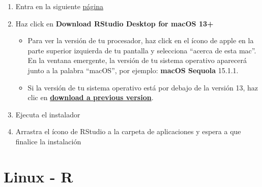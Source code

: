 \documentclass[
  spanish,
  12pt,
  letterpaper,
  DIV=11,
  numbers=noendperiod]{scrreprt}
\providecommand{\tightlist}{%
  \setlength{\itemsep}{0pt}\setlength{\parskip}{0pt}}
\begin{document}
\begin{enumerate}
\def\labelenumi{\arabic{enumi}.}
\tightlist
\item
  Entra en la siguiente
  \href{https://posit.co/download/rstudio-desktop/\#download}{página}
\item
  Haz click en \textbf{Download RStudio Desktop for macOS 13+}

  \begin{itemize}
  \tightlist
  \item
    Para ver la versión de tu procesador, haz click en el ícono de apple
    en la parte superior izquierda de tu pantalla y selecciona ``acerca
    de esta mac''. En la ventana emergente, la versión de tu sistema
    operativo aparecerá junto a la palabra ``macOS'', por ejemplo:
    \textbf{macOS Sequola} 15.1.1.
  \item
    Si la versión de tu sistema operativo está por debajo de la versión
    13, haz clic en \ul{\textbf{download a previous version}}.
  \end{itemize}
\item
  Ejecuta el instalador
\item
  Arrastra el ícono de RStudio a la carpeta de aplicaciones y espera a
  que finalice la instalación
\end{enumerate}

\section{Linux - R}\label{linux---r}
\end{document}
